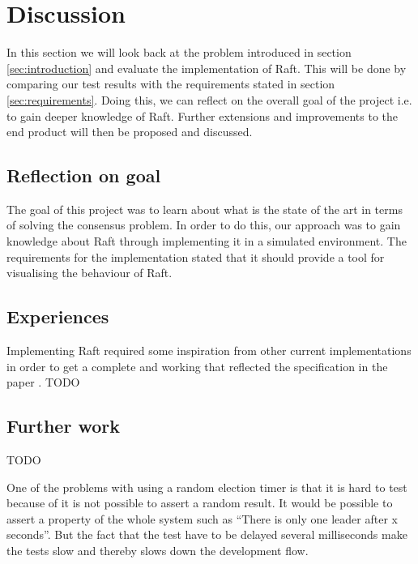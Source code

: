 \section{Discussion} %
\label{sec:discussion}
In this section we will look back at the problem introduced in section \ref{sec:introduction} and evaluate the implementation of Raft. This will be done by comparing our test results with the requirements stated in section \ref{sec:requirements}. Doing this, we can reflect on the overall goal of the project i.e. to gain deeper knowledge of Raft. Further extensions and improvements to the end product will then be proposed and discussed.

\subsection{Reflection on goal}
The goal of this project was to learn about what is the state of the art in terms of solving the consensus problem. In order to do this, our approach was to gain knowledge about Raft through implementing it in a simulated environment. 
The requirements for the implementation stated that it should provide a tool for visualising the behaviour of Raft. 

\subsection{Experiences}
Implementing Raft required some inspiration from other current implementations in order to get a complete and working that reflected the specification in the paper \cite{Raft}. TODO
\subsection{Further work}
TODO

One of the problems with using a random election timer is that it is hard to test because of it is not possible to assert a random result. It would be possible to assert a property of the whole system such as ``There is only one leader after x seconds''. But the fact that the test have to be delayed several milliseconds make the tests slow and thereby slows down the development flow.





